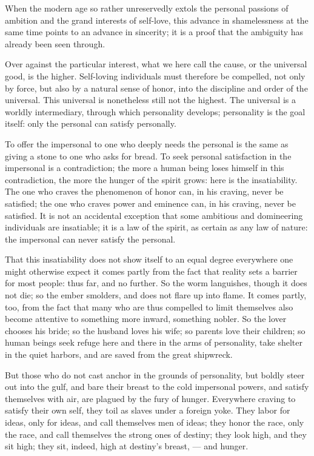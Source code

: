\documentclass[12pt,a4paper]{book}
\begin{document}
When the modern age so rather unreservedly extols the personal passions of ambition and the grand interests of self-love, this advance in shamelessness at the same time points to an advance in sincerity; it is a proof that the ambiguity has already been seen through.

Over against the particular interest, what we here call the cause, or the universal good, is the higher. Self-loving individuals must therefore be compelled, not only by force, but also by a natural sense of honor, into the discipline and order of the universal. This universal is nonetheless still not the highest. The universal is a worldly intermediary, through which personality develops; personality is the goal itself: only the personal can satisfy personally.

To offer the impersonal to one who deeply needs the personal is the same as giving a stone to one who asks for bread. To seek personal satisfaction in the impersonal is a contradiction; the more a human being loses himself in this contradiction, the more the hunger of the spirit grows: here is the insatiability. The one who craves the phenomenon of honor can, in his craving, never be satisfied; the one who craves power and
eminence can, in his craving, never be satisfied. It is not an accidental exception that some ambitious and domineering individuals are insatiable; it is a law of the spirit, as certain as any law of nature: the impersonal can never satisfy the personal.

That this insatiability does not show itself to an equal degree everywhere one might otherwise expect it comes partly from the fact that reality sets a barrier for most people: thus far, and no further. So the worm languishes, though it does not die; so the ember smolders, and does not flare up into flame. It comes partly, too, from the fact that many who are thus compelled to limit themselves also become attentive to something more inward, something nobler. So the lover chooses his bride; so the husband loves his wife; so parents love their children; so human beings seek refuge here and there in the arms of personality, take shelter in the quiet harbors, and are saved from the great shipwreck.

But those who do not cast anchor in the grounds of personality, but boldly steer out into the gulf, and bare their breast to the cold impersonal powers, and satisfy themselves with air, are plagued by the fury of hunger. Everywhere craving to satisfy their own self, they toil as slaves under a foreign yoke. They labor for ideas, only for ideas, and call themselves men of ideas; they honor the race, only the race, and call themselves the strong ones of destiny; they look high, and they sit high; they sit, indeed, high at destiny's breast, --- and hunger.
\end{document}
